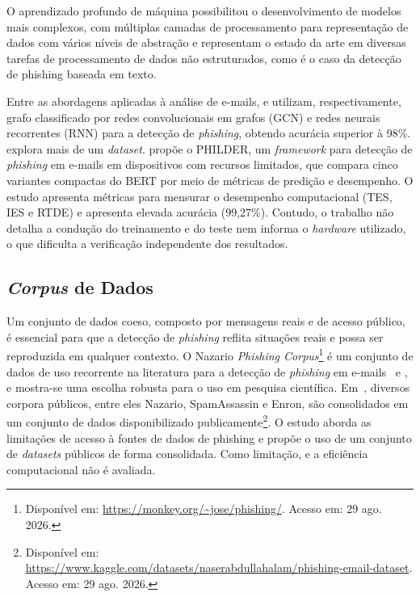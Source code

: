 \documentclass[12pt]{article}
\begin{document}
        O aprendizado profundo de máquina possibilitou o desenvolvimento de modelos mais complexos, com múltiplas camadas de processamento para representação de dados com vários níveis de abstração e representam o estado da arte em diversas tarefas de processamento de dados não estruturados, como é o caso da detecção de phishing baseada em texto.

        Entre as abordagens aplicadas à análise de e-mails, \cite{alhogail2021applying} e \cite{halgas2020catching} utilizam, respectivamente, grafo classificado por redes convolucionais em grafos (GCN) e redes neurais recorrentes (RNN) para a detecção de \textit{phishing}, obtendo acurácia superior à 98\%. \cite{halgas2020catching} explora mais de um \textit{dataset}. \cite{bispo2025philder} propõe o PHILDER, um \textit{framework} para detecção de \textit{phishing} em e-mails em dispositivos com recursos limitados, que compara cinco variantes compactas do BERT por meio de métricas de predição e desempenho. O estudo apresenta métricas para mensurar o desempenho computacional  (TES, IES e RTDE) e apresenta elevada acurácia (99,27\%). Contudo, o trabalho não detalha a condução do treinamento e do teste nem informa o \textit{hardware} utilizado, o que dificulta a verificação independente dos resultados.


\subsection{\textit{Corpus} de Dados} \label{sub:trab_nazario}

        Um conjunto de dados coeso, composto por mensagens reais e de acesso público, é essencial para que a detecção de \textit{phishing} reflita situações reais e possa ser reproduzida em qualquer contexto. O Nazario \textit{Phishing Corpus}\footnote{Disponível em: \url{https://monkey.org/~jose/phishing/}. Acesso em: 29 ago. 2026.} é um conjunto de dados de uso recorrente na literatura para a detecção de \textit{phishing} em e-mails~\cite{mujtaba2017email,halgas2020catching} e \cite{gualberto2020feature}, e mostra-se uma escolha robusta para o uso em pesquisa científica.  Em~\cite{alsubaiey2024novel}, diversos corpora públicos, entre eles Nazario, SpamAssassin e Enron, são consolidados em um conjunto de dados disponibilizado publicamente\footnote{Disponível em: \url{https://www.kaggle.com/datasets/naserabdullahalam/phishing-email-dataset}. Acesso em: 29 ago. 2026.}. O estudo aborda as limitações de acesso à fontes de dados de phishing e propõe o uso de um conjunto de \textit{datasets} públicos de forma consolidada. Como limitação, e a eficiência computacional não é avaliada.
\end{document}

